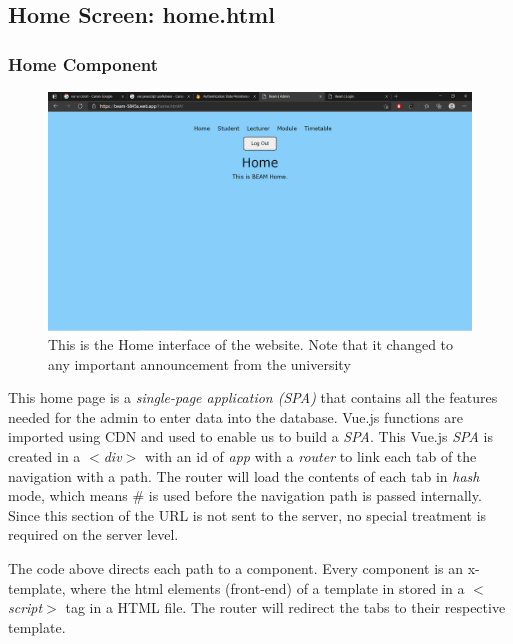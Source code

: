\documentclass[../report.tex]{subfiles}
\begin{document}
\subsection{Home Screen: home.html}
\subsubsection{Home Component}
\begin{figure}[H]
	\centering
	\includegraphics[width=.7\linewidth]{../images/07/01-02-home.png}
	\caption{This is the Home interface of the website. Note that it changed to any important announcement from the university}
	\label{fig:07-01-02-home}
\end{figure}



This home page is a \textit{single-page application (SPA)} that contains all the features needed for the admin to enter data into the database. Vue.js functions are imported using CDN and used to enable us to build a \textit{SPA}. This Vue.js \textit{SPA} is created in a \textit{$<$div$>$} with an id of \textit{app} with a \textit{router} to link each tab of the navigation with a path. The router will load the contents of each tab in \textit{hash} mode, which means \# is used before the navigation path is passed internally. Since this section of the URL is not sent to the server, no special treatment is required on the server level.
 
The code above directs each path to a component. Every component is an x-template, where the html elements (front-end) of a template in stored in a \textit{$<$script$>$} tag in a HTML file. The router will redirect the tabs to their respective template.

\medskip
\end{document}
